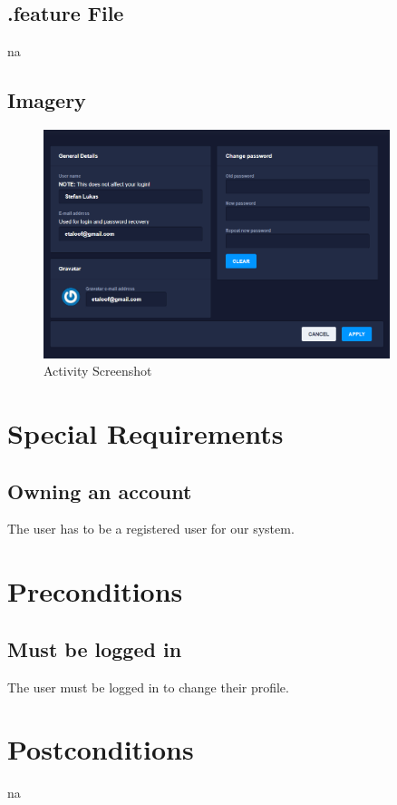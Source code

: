 \documentclass[a4paper,12pt,chapterprefix=false,bibliography=totoc,listof=totoc,book]{scrreprt}
\begin{document}
    \section{.feature File}
    \gls{na}

    \section{Imagery}
    \begin{figure}[H]
        \includegraphics[width=0.9\textwidth]{diagramms/UCChangeUserProfileScreenshot.png}
        \caption{Activity Screenshot}
        \label{fig:screen}
    \end{figure}

    \chapter{Special Requirements}
    \section{Owning an account}
    The user has to be a registered user for our system.

    \chapter{Preconditions}
    \section{Must be logged in}
    The user must be logged in to change their profile.

    \chapter{Postconditions}
    \gls{na}
\end{document}
